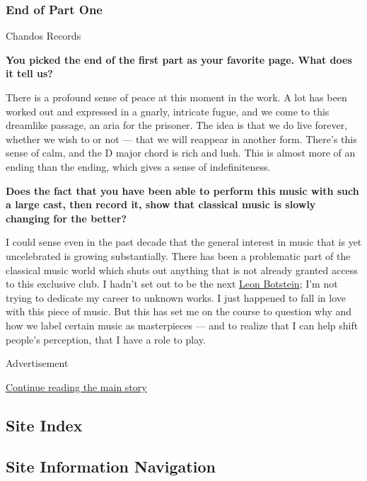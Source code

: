 \hypertarget{end-of-part-one}{%
\subsubsection{End of Part One}\label{end-of-part-one}}

Chandos Records

\textbf{You picked the end of the first part as your favorite page. What
does it tell us?}

There is a profound sense of peace at this moment in the work. A lot has
been worked out and expressed in a gnarly, intricate fugue, and we come
to this dreamlike passage, an aria for the prisoner. The idea is that we
do live forever, whether we wish to or not --- that we will reappear in
another form. There's this sense of calm, and the D major chord is rich
and lush. This is almost more of an ending than the ending, which gives
a sense of indefiniteness.

\textbf{Does the fact that you have been able to perform this music with
such a large cast, then record it, show that classical music is slowly
changing for the better?}

I could sense even in the past decade that the general interest in music
that is yet uncelebrated is growing substantially. There has been a
problematic part of the classical music world which shuts out anything
that is not already granted access to this exclusive club. I hadn't set
out to be the next
\href{https://www.nytimes.com/2015/07/28/arts/music/review-the-wreckers-a-tale-of-piracy-love-and-betrayal.html}{Leon
Botstein}; I'm not trying to dedicate my career to unknown works. I just
happened to fall in love with this piece of music. But this has set me
on the course to question why and how we label certain music as
masterpieces --- and to realize that I can help shift people's
perception, that I have a role to play.

Advertisement

\protect\hyperlink{after-bottom}{Continue reading the main story}

\hypertarget{site-index}{%
\subsection{Site Index}\label{site-index}}

\hypertarget{site-information-navigation}{%
\subsection{Site Information
Navigation}\label{site-information-navigation}}

